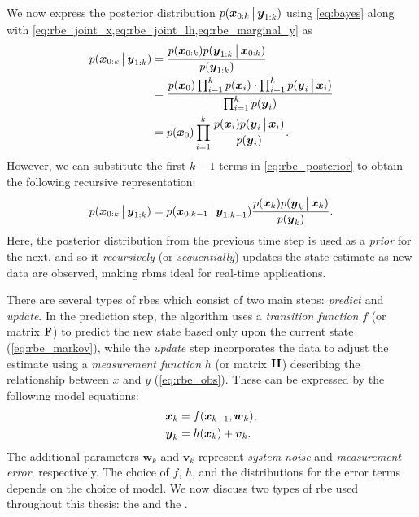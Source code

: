 We now express the posterior distribution $p(\boldsymbol x_{0:k}\,\big|\,{}\boldsymbol{y}_{1:k})$ using \cref{eq:bayes} along with \cref{eq:rbe_joint_x,eq:rbe_joint_lh,eq:rbe_marginal_y} as
\begin{equation}
\label{eq:rbe_posterior}
\begin{split}
p(\boldsymbol x_{0:k}\,\big|\,{}\boldsymbol{y}_{1:k})
&= \frac{p(\boldsymbol x_{0:k})p(\boldsymbol{y}_{1:k}\,\big|\,{}\boldsymbol x_{0:k})}{p(\boldsymbol{y}_{1:k})} \\
&= \frac{
    p(\boldsymbol x_0)\prod_{i=1}^k p(\boldsymbol x_i) \cdot
    \prod_{i=1}^k p(\boldsymbol{y}_i\,\big|\,{}\boldsymbol x_i)
}{
    \prod_{i=1}^k p(\boldsymbol{y}_i)
} \\
&= p(\boldsymbol x_0)\prod_{i=1}^k
\frac{
    p(\boldsymbol x_i) p(\boldsymbol{y}_i\,\big|\,{}\boldsymbol x_i)
}{
    p(\boldsymbol{y}_i)
}.
\end{split}
\end{equation}
However, we can substitute the first $k-1$ terms in \cref{eq:rbe_posterior} to obtain the following recursive representation:
\begin{equation}
\label{eq:rbe_posterior_recursive}
p(\boldsymbol x_{0:{k}}\,\big|\,{}\boldsymbol{y}_{1:k})
= p(\boldsymbol x_{0:k-1}\,\big|\,{}\boldsymbol{y}_{1:k-1})
\frac{
    p(\boldsymbol x_{k}) p(\boldsymbol{y}_{k}\,\big|\,{}\boldsymbol x_{k})
}{
    p(\boldsymbol{y}_{k})
}.
\end{equation}
Here, the posterior distribution from the previous time step is used as a \emph{prior} for the next, and so it \emph{recursively} (or \emph{sequentially}) updates the state estimate as new data are observed, making \glspl{rbm} ideal for real-time applications.


There are several types of \glspl{rbe} which consist of two main steps: \emph{predict} and \emph{update}. In the prediction step, the algorithm uses a \emph{transition function} $f$ (or matrix $\mathbf{F}$) to predict the new state based only upon the current state (\cref{eq:rbe_markov}), while the \emph{update} step incorporates the data to adjust the estimate using a \emph{measurement function} $h$ (or matrix $\mathbf{H}$) describing the relationship between $x$ and $y$ (\cref{eq:rbe_obs}). These can be expressed by the following model equations:
\begin{equation}
\label{eq:rbe_model}
\begin{split}
\boldsymbol x_k &= f(\boldsymbol x_{k-1}, \boldsymbol{w}_k), \\
\boldsymbol{y}_k &= h(\boldsymbol x_k) + \boldsymbol{v}_k.
\end{split}
\end{equation}
The additional parameters $\boldsymbol{w}_k$ and $\boldsymbol{v}_k$ represent \emph{system noise} and \emph{measurement error}, respectively. The choice of $f$, $h$, and the distributions for the error terms depends on the choice of model. We now discuss two types of \gls{rbe} used throughout this thesis: the \kf{} and the \pf{}.


